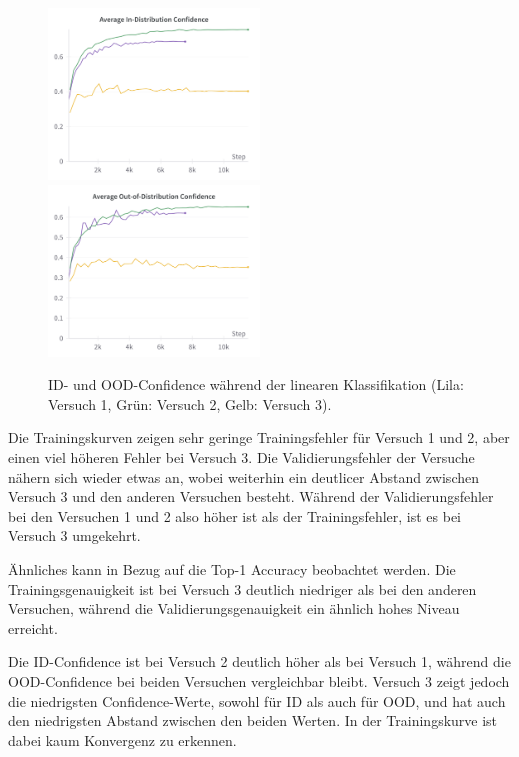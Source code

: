\begin{figure}
	\centering
	\includegraphics[width=0.5\textwidth]{figure_results_supcon-lin_avg-id-conf.png}%
	\includegraphics[width=0.5\textwidth]{figure_results_supcon-lin_avg-ood-conf.png}
	\caption[ID- und OOD-Confidence während der linearen Klassifikation.]{ID- und OOD-Confidence während der linearen Klassifikation (\textcolor{exp1}{Lila}: Versuch 1, \textcolor{exp2}{Grün}: Versuch 2, \textcolor{exp3}{Gelb}: Versuch 3).}
	\label{fig:supcon-lin-ood-detection}
\end{figure}

Die Trainingskurven zeigen sehr geringe Trainingsfehler für Versuch 1 und 2, aber einen viel höheren Fehler bei Versuch 3. Die Validierungsfehler der Versuche nähern sich wieder etwas an, wobei weiterhin ein deutlicer Abstand zwischen Versuch 3 und den anderen Versuchen besteht. Während der Validierungsfehler bei den Versuchen 1 und 2 also höher ist als der Trainingsfehler, ist es bei Versuch 3 umgekehrt.

Ähnliches kann in Bezug auf die Top-1 Accuracy beobachtet werden. Die Trainingsgenauigkeit ist bei Versuch 3 deutlich niedriger als bei den anderen Versuchen, während die Validierungsgenauigkeit ein ähnlich hohes Niveau erreicht.

Die ID-Confidence ist bei Versuch 2 deutlich höher als bei Versuch 1, während die OOD-Confidence bei beiden Versuchen vergleichbar bleibt. Versuch 3 zeigt jedoch die niedrigsten Confidence-Werte, sowohl für ID als auch für OOD, und hat auch den niedrigsten Abstand zwischen den beiden Werten. In der Trainingskurve ist dabei kaum Konvergenz zu erkennen.


